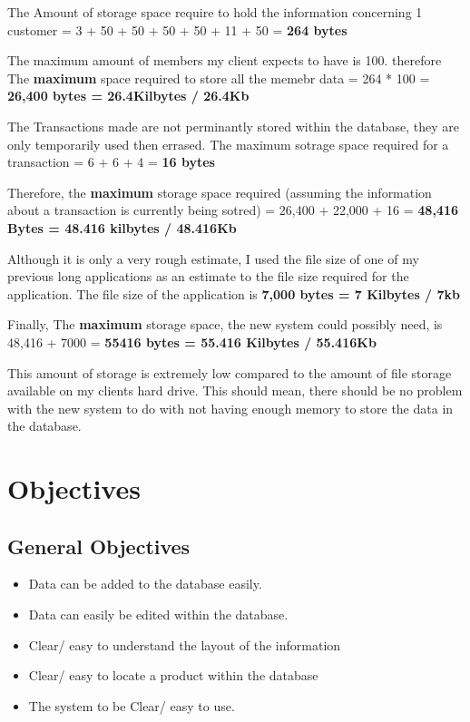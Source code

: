 \begin{flushleft}
The Amount of storage space require to hold the information concerning 1 customer = 3 + 50 + 50 + 50 + 50 + 11 + 50 = \textbf{264 bytes} \par

The maximum amount of members my client expects to have is 100. therefore The \textbf{maximum} space required to store all the memebr data = 264 * 100 = \textbf{26,400 bytes = 26.4Kilbytes / 26.4Kb} 

The Transactions made are not perminantly stored within the database, they are only temporarily used then errased. The maximum sotrage space required for a transaction = 6 + 6 + 4 = \textbf{16 bytes}


Therefore, the \textbf{maximum} storage space required (assuming the information about a transaction is currently being sotred) = 26,400 + 22,000 + 16 = \textbf{48,416 Bytes = 48.416 kilbytes / 48.416Kb}

Although it is only a very rough estimate, I used the file size of one of my previous long applications as an estimate to the file size required for the application. The file size of the application is \textbf{7,000 bytes = 7 Kilbytes / 7kb}

Finally, The \textbf{maximum} storage space, the new system could possibly need, is 48,416 + 7000 = \textbf{55416 bytes = 55.416 Kilbytes / 55.416Kb}


This amount of storage is extremely low compared to the amount of file storage available on my clients hard drive. This should mean, there should be no problem with the new system to do with not having enough memory to store the data in the database.
\end{flushleft}

\section{Objectives}

\subsection{General Objectives}

\begin{flushleft}
\begin{itemize}
\item Data can be added to the database easily.
\item Data can easily be edited within the database.
\item Clear/ easy to understand the layout of the information
\item Clear/ easy to locate a product within the database
\item The system to be Clear/ easy to use.
\end{itemize}
\end{flushleft} 



